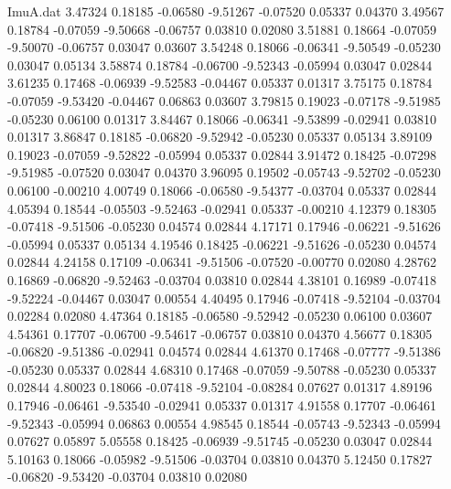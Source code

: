 \begin{filecontents}{ImuA.dat}
   3.47324    0.18185   -0.06580   -9.51267   -0.07520    0.05337    0.04370
   3.49567    0.18784   -0.07059   -9.50668   -0.06757    0.03810    0.02080
   3.51881    0.18664   -0.07059   -9.50070   -0.06757    0.03047    0.03607
   3.54248    0.18066   -0.06341   -9.50549   -0.05230    0.03047    0.05134
   3.58874    0.18784   -0.06700   -9.52343   -0.05994    0.03047    0.02844
   3.61235    0.17468   -0.06939   -9.52583   -0.04467    0.05337    0.01317
   3.75175    0.18784   -0.07059   -9.53420   -0.04467    0.06863    0.03607
   3.79815    0.19023   -0.07178   -9.51985   -0.05230    0.06100    0.01317
   3.84467    0.18066   -0.06341   -9.53899   -0.02941    0.03810    0.01317
   3.86847    0.18185   -0.06820   -9.52942   -0.05230    0.05337    0.05134
   3.89109    0.19023   -0.07059   -9.52822   -0.05994    0.05337    0.02844
   3.91472    0.18425   -0.07298   -9.51985   -0.07520    0.03047    0.04370
   3.96095    0.19502   -0.05743   -9.52702   -0.05230    0.06100   -0.00210
   4.00749    0.18066   -0.06580   -9.54377   -0.03704    0.05337    0.02844
   4.05394    0.18544   -0.05503   -9.52463   -0.02941    0.05337   -0.00210
   4.12379    0.18305   -0.07418   -9.51506   -0.05230    0.04574    0.02844
   4.17171    0.17946   -0.06221   -9.51626   -0.05994    0.05337    0.05134
   4.19546    0.18425   -0.06221   -9.51626   -0.05230    0.04574    0.02844
   4.24158    0.17109   -0.06341   -9.51506   -0.07520   -0.00770    0.02080
   4.28762    0.16869   -0.06820   -9.52463   -0.03704    0.03810    0.02844
   4.38101    0.16989   -0.07418   -9.52224   -0.04467    0.03047    0.00554
   4.40495    0.17946   -0.07418   -9.52104   -0.03704    0.02284    0.02080
   4.47364    0.18185   -0.06580   -9.52942   -0.05230    0.06100    0.03607
   4.54361    0.17707   -0.06700   -9.54617   -0.06757    0.03810    0.04370
   4.56677    0.18305   -0.06820   -9.51386   -0.02941    0.04574    0.02844
   4.61370    0.17468   -0.07777   -9.51386   -0.05230    0.05337    0.02844
   4.68310    0.17468   -0.07059   -9.50788   -0.05230    0.05337    0.02844
   4.80023    0.18066   -0.07418   -9.52104   -0.08284    0.07627    0.01317
   4.89196    0.17946   -0.06461   -9.53540   -0.02941    0.05337    0.01317
   4.91558    0.17707   -0.06461   -9.52343   -0.05994    0.06863    0.00554
   4.98545    0.18544   -0.05743   -9.52343   -0.05994    0.07627    0.05897
   5.05558    0.18425   -0.06939   -9.51745   -0.05230    0.03047    0.02844
   5.10163    0.18066   -0.05982   -9.51506   -0.03704    0.03810    0.04370
   5.12450    0.17827   -0.06820   -9.53420   -0.03704    0.03810    0.02080

\end{filecontents}
